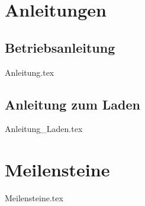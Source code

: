 \documentclass[paper=a4,12pt]{scrreprt}
\begin{document}
\chapter{Anleitungen}
\section{Betriebsanleitung}
{Anleitung.tex}

\section{Anleitung zum Laden \label{sec:Anleitung_Laden}}
{Anleitung_Laden.tex}

\chapter{Meilensteine}
{Meilensteine.tex}

\clearpage
\appendix
\def\chapterpagestyle{empty} 




\setcounter{lofdepth}{2}
\dipalistoffigures

\setcounter{lotdepth}{2}
\dipalistoftables

\newpage

 
 
\end{document}

